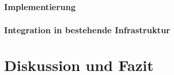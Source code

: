 \documentclass[a4paper, 12pt, oneside]{scrbook}
\begin{document}
		\subsection{Implementierung}
		
			
		
		\subsection{Integration in bestehende Infrastruktur}
			

	
	
	\chapter{Diskussion und Fazit}
	
	
	
	
	\frontmatter
	\printbibliography
\end{document}
